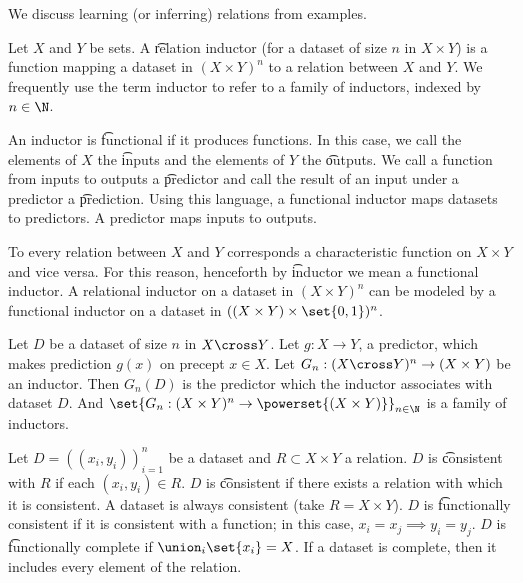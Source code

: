 

We discuss learning (or inferring) relations from examples.


Let $X$ and $Y$ be sets.
A \t{relation inductor} (for a dataset of size $n$ in $X \times Y$) is a function mapping a dataset in $(X \times Y)^n$ to a relation between $X$ and $Y$.
We frequently use the term inductor to refer to a family of inductors, indexed by $n \in \N$.

An inductor is \t{functional} if it produces functions.
In this case, we call the elements of $X$ the \t{inputs} and the elements of $Y$ the \t{outputs}.
We call a function from inputs to outputs a \t{predictor}    and call the result of an input under a predictor a \t{prediction}.
Using this language, a functional inductor maps datasets to predictors.
A predictor maps inputs to outputs.

To every relation between $X$ and $Y$ corresponds a characteristic function on $X \times Y$ and vice versa.
For this reason, henceforth by \t{inductor} we mean a functional inductor.
A relational inductor on a dataset in $(X \times Y)^n$ can be modeled by a functional inductor on a dataset in $((X \times Y) \times \set{0, 1})^n$.


Let $D$ be a dataset of size $n$ in $X \cross Y$.
Let $g: X \to Y$, a predictor, which makes prediction $g(x)$ on precept $x \in X$.
Let $G_n: (X \cross Y)^n \to (X \times Y)$ be an inductor.
Then $G_n(D)$ is the predictor which the inductor associates with dataset $D$.
And $\set{G_n: (X \times Y)^n \to \powerset{(X \times Y)}}_{n \in \N}$ is a family of inductors.


Let $D = ((x_i, y_i))_{i =1}^{n}$ be a dataset and $R \subset X \times Y$ a relation.
$D$ is \t{consistent with $R$} if each $(x_i, y_i) \in R$.
$D$ is \t{consistent} if there exists a relation with which it is consistent.
A dataset is always consistent (take $R = X \times Y$).
$D$ is \t{functionally consistent} if it is consistent with a function; in this case, $x_i = x_j \implies y_i = y_j$.
$D$ is \t{functionally complete} if $\union_i\set{x_i} = X$.
If a dataset is complete, then it includes every element of the relation.



